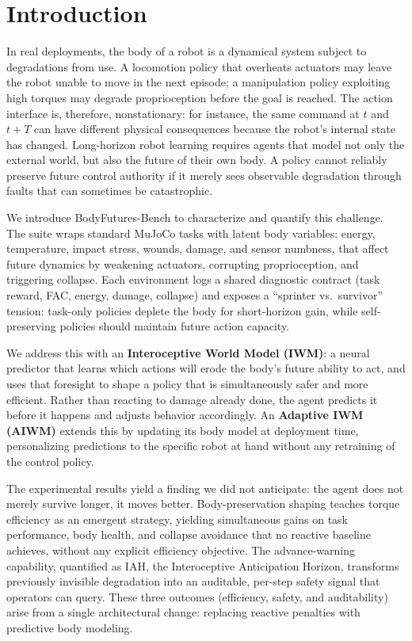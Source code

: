 \documentclass{article}
\begin{document}


\section{Introduction}

In real deployments, the body of a robot is a dynamical system subject to degradations from use. A locomotion policy that overheats actuators may leave the robot unable to move in the next episode; a manipulation policy exploiting high torques may degrade proprioception before the goal is reached. The action interface is, therefore, nonstationary: for instance, the same command at $t$ and $t+T$ can have different physical consequences because the robot's internal state has changed. Long-horizon robot learning requires agents that model not only the external world, but also the future of their own body. A policy cannot reliably preserve future control authority if it merely sees observable degradation through faults that can sometimes be catastrophic.

We introduce BodyFutures-Bench to characterize and quantify this challenge. The suite wraps standard MuJoCo tasks with latent body variables: energy, temperature, impact stress, wounds, damage, and sensor numbness, that affect future dynamics by weakening actuators, corrupting proprioception, and triggering collapse. Each environment logs a shared diagnostic contract (task reward, FAC, energy, damage, collapse) and exposes a ``sprinter vs.\ survivor'' tension: task-only policies deplete the body for short-horizon gain, while self-preserving policies should maintain future action capacity.

We address this with an \textbf{Interoceptive World Model (IWM)}: a neural predictor that learns which actions will erode the body's future ability to act, and uses that foresight to shape a policy that is simultaneously safer and more efficient. Rather than reacting to damage already done, the agent predicts it before it happens and adjusts behavior accordingly. An \textbf{Adaptive IWM (AIWM)} extends this by updating its body model at deployment time, personalizing predictions to the specific robot at hand without any retraining of the control policy.

The experimental results yield a finding we did not anticipate: the agent does not merely survive longer, it moves better.
Body-preservation shaping teaches torque efficiency as an emergent strategy, yielding simultaneous gains on task performance, body health, and collapse avoidance that no reactive baseline achieves, without any explicit efficiency objective.
The advance-warning capability, quantified as IAH, the Interoceptive Anticipation Horizon, transforms previously invisible degradation into an auditable, per-step safety signal that operators can query.
These three outcomes (efficiency, safety, and auditability) arise from a single architectural change: replacing reactive penalties with predictive body modeling.
\end{document}
